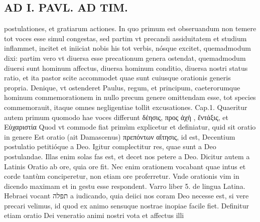 \documentclass{article}
\begin{document}
\begin{pages}
\section*{AD I. PAVL. AD TIM. }
\marginpar{[ p.42 ]}\pstart postulationes, et gratiarum actiones. In quo primum est obseruandum non temere tot voces esse simul congestas, sed partim vt precandi assiduitatem et studium inflammet, incitet et iniiciat nobis his tot verbis, nósque excitet, quemadmodum dixi: partim vero vt diuersa esse precationum genera ostendat, quemadmodum diuersi sunt hominum affectus, diuersa hominum conditio, diuersa nostri status ratio, et ita pastor scite accommodet quae sunt cuiusque orationis generis propria. Denique, vt ostenderet Paulus, regum, et principum, caeterorumque hominum commemorationem in nullo precum genere omittendam esse, tot species commemorauit, itaque omnes negligentiae tollit excusationes.  \pend\pstart Cap.1. Quaeritur autem primum quomodo hae voces differunt δέησις, προς ἀχὴ  , ἔντάξις, et Εὐχαριστία Quod vt commode fiat primùm explicetur et definiatur, quid sit oratio in genere  \pend\pstart Est oratio (ait Damascenus) πρεπόντων αἴτησις, id est, Decentium postulatio petitióque a Deo. Igitur complectitur res, quae sunt a Deo postulandae. Illas enim solas fas est, et decet nos petere a Deo. Dicitur autem a Latinis Oratio ab ore, quia ore fit. Nec enim orationem vocabant quae intus et corde tantùm conciperetur, non etiam ore proferretur. Vnde orationis vim in dicendo maximam et in gestu esse respondent. Varro liber  5. de lingua Latina. Hebraei vocant תפלה a iudicando, quia deiici nos coram Deo necesse est, si vere precari velimus, id quod ex animo sensuque  nostrae inopiae facile fiet. Definitur etiam oratio Dei veneratio animi nostri vota et affectus illi  \pend

\end{pages}
\end{document}

